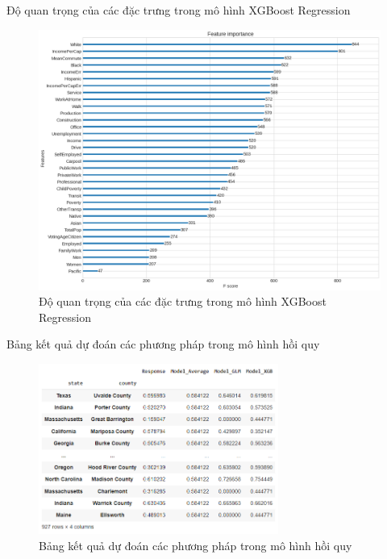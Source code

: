 \documentclass[10pt]{beamer}
\theoremstyle{remark}
\theoremstyle{definition}
\begin{document}
\begin{frame}{Độ quan trọng của các đặc trưng trong mô hình XGBoost Regression}
	\begin{figure}[h!]
        \centering
        \includegraphics[height=0.65\textheight]{figures/XGBoost_Regression_Feature_Importance.png}
        \caption{Độ quan trọng của các đặc trưng trong mô hình XGBoost Regression}
    \end{figure}
\end{frame}


\begin{frame}{Bảng kết quả dự đoán các phương pháp trong mô hình hồi quy}
	\begin{figure}[h!]
        \centering
        \includegraphics[width=0.7\textwidth]{figures/Regression_Model_Result.png}
        \caption{Bảng kết quả dự đoán các phương pháp trong mô hình hồi quy}
    \end{figure}
\end{frame}
\end{document}
